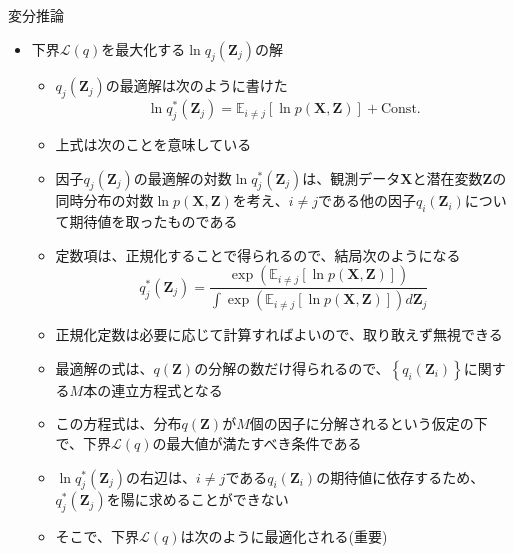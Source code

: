 \documentclass[dvipdfmx,notheorems,t]{beamer}
\begin{document}
\begin{frame}{変分推論}

\begin{itemize}
	\item 下界$\mathcal{L}(q)$を最大化する$\ln q_j(\bm{Z}_j)$の解
	\begin{itemize}
		\item $q_j(\bm{Z}_j)$の最適解は次のように書けた
		\begin{equation}
			\ln q_j^*(\bm{Z}_j) = \mathbb{E}_{i \neq j}[\ln p(\bm{X}, \bm{Z})] + \mathrm{Const.}
		\end{equation}
		
		\item 上式は次のことを意味している
		\item 因子$q_j(\bm{Z}_j)$の最適解の対数$\ln q_j^*(\bm{Z}_j)$は、観測データ$\bm{X}$と潜在変数$\bm{Z}$の\alert{同時分布の対数}$\ln p(\bm{X}, \bm{Z})$\alert{を考え}、$i \neq j$である他の因子$q_i(\bm{Z}_i)$について\alert{期待値を取ったもの}である
		\newline
		
		\item 定数項は、正規化することで得られるので、結局次のようになる
		\begin{equation}
			q_j^*(\bm{Z}_j) = \frac{\exp(\mathbb{E}_{i \neq j}[\ln p(\bm{X}, \bm{Z})])}{\displaystyle \int \exp(\mathbb{E}_{i \neq j}[\ln p(\bm{X}, \bm{Z})]) d\bm{Z}_j}
		\end{equation}
		
		\item 正規化定数は必要に応じて計算すればよいので、取り敢えず無視できる
		\newline
		
		\item 最適解の式は、$q(\bm{Z})$の分解の数だけ得られるので、$\left\{ q_i(\bm{Z}_i) \right\}$に関する$M$本の連立方程式となる
		\item この方程式は、分布$q(\bm{Z})$が$M$個の因子に分解されるという仮定の下で、下界$\mathcal{L}(q)$の最大値が満たすべき条件である
		\newline
		
		\item $\ln q_j^*(\bm{Z}_j)$の右辺は、$i \neq j$である$q_i(\bm{Z}_i)$の期待値に依存するため、$q_j^*(\bm{Z}_j)$を陽に求めることができない
		\item そこで、下界$\mathcal{L}(q)$は次のように最適化される(\alert{重要})
	\end{itemize}
\end{itemize}

\end{frame}
\end{document}
